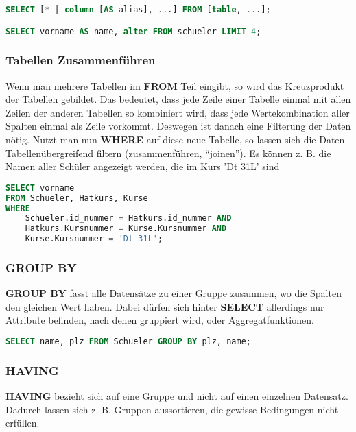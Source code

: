 \begin{lstlisting}[language=sql]
SELECT [* | column [AS alias], ...] FROM [table, ...];

SELECT vorname AS name, alter FROM schueler LIMIT 4;
\end{lstlisting}

\subsubsection{Tabellen Zusammenführen}

Wenn man mehrere Tabellen im \textbf{FROM} Teil eingibt, so wird das Kreuzprodukt der
Tabellen gebildet. Das bedeutet, dass jede Zeile einer Tabelle einmal mit allen
Zeilen der anderen Tabellen so kombiniert wird, dass jede Wertekombination
aller Spalten einmal als Zeile vorkommt. Deswegen ist danach eine Filterung der
Daten nötig. Nutzt man nun \textbf{WHERE} auf diese neue Tabelle, so lassen
sich die Daten Tabellenübergreifend filtern (zusammenführen, ``joinen'').
Es können z. B. die Namen aller Schüler angezeigt werden, die im Kurs 'Dt 31L' sind

\begin{lstlisting}[language=sql]
SELECT vorname
FROM Schueler, Hatkurs, Kurse
WHERE 
    Schueler.id_nummer = Hatkurs.id_nummer AND
    Hatkurs.Kursnummer = Kurse.Kursnummer AND
    Kurse.Kursnummer = 'Dt 31L';
\end{lstlisting}

\subsubsection{GROUP BY}

\textbf{GROUP BY} fasst alle Datensätze zu einer Gruppe zusammen, wo die
Spalten den gleichen Wert haben. Dabei dürfen sich hinter \textbf{SELECT}
allerdings nur Attribute befinden, nach denen gruppiert wird, oder Aggregatfunktionen.

\begin{lstlisting}[language=sql]
SELECT name, plz FROM Schueler GROUP BY plz, name;
\end{lstlisting}

\subsubsection{HAVING}

\textbf{HAVING} bezieht sich auf eine Gruppe und nicht auf einen einzelnen Datensatz.
Dadurch lassen sich z. B. Gruppen aussortieren, die gewisse Bedingungen nicht erfüllen.

